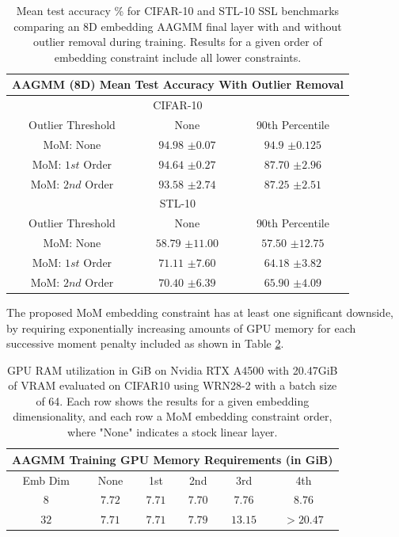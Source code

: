 \documentclass[10pt,twocolumn,letterpaper]{article}
\begin{document}
\begin{table}[ht!]
	\begin{tabular}{c|c|c}
		
		\multicolumn{3}{c}{AAGMM (8D) Mean Test Accuracy With Outlier Removal} \\ \hline\hline
		\multicolumn{3}{c}{CIFAR-10}            \\ 
		\hline
		Outlier Threshold & None & 90th Percentile \\
		\hline
		MoM: None & $94.98$ \scriptsize{$\pm 0.07$} & $94.9$ \scriptsize{$\pm 0.125$} \\
		MoM: $1st$ Order & $94.64$ \scriptsize{$\pm 0.27$} & $87.70$ \scriptsize{$\pm 2.96$}\\
		MoM: $2nd$ Order & $93.58$ \scriptsize{$\pm 2.74$} & $87.25$ \scriptsize{$\pm 2.51$} \\
		
		\hline
		\hline
		\multicolumn{3}{c}{STL-10}            \\ 
		\hline
		Outlier Threshold & None & 90th Percentile \\
		\hline
		MoM: None & $58.79$ \scriptsize{$\pm 11.00$} & $57.50$ \scriptsize{$\pm 12.75$} \\
		MoM: $1st$ Order & $71.11$ \scriptsize{$\pm 7.60$} & $64.18$ \scriptsize{$\pm 3.82$}\\
		MoM: $2nd$ Order & $70.40$ \scriptsize{$\pm 6.39$} & $65.90$ \scriptsize{$\pm 4.09$} \\
	\end{tabular}
	\caption{Mean test accuracy \% for CIFAR-10 and STL-10 SSL benchmarks comparing an 8D embedding AAGMM final layer with and without outlier removal during training. Results for a given order of embedding constraint include all lower constraints.}
	\label{outlierRemoval}
\end{table}

The proposed MoM embedding constraint has at least one significant downside, by requiring exponentially increasing amounts of GPU memory for each successive moment penalty included as shown in Table \ref{gpuRam}.

\begin{table}[h!]
	\begin{tabular}{c|c|c|c|c|c}
		
		\multicolumn{6}{c}{AAGMM Training GPU Memory Requirements (in GiB)} \\
		\hline\hline
		Emb Dim & None & 1st & 2nd & 3rd & 4th \\
		\hline
		$8$ & $7.72$ & $7.71$ & $7.70$ & $7.76$ & $8.76$ \\
		$32$ & $7.71$ & $7.71$ & $7.79$ & $13.15$ & $>20.47$ \\
		
	\end{tabular}
	\caption{GPU RAM utilization in GiB on Nvidia RTX A4500 with 20.47GiB of VRAM evaluated on CIFAR10 using WRN28-2 with a batch size of 64. Each row shows the results for a given embedding dimensionality, and each row a MoM embedding constraint order, where "None" indicates a stock linear layer.}
	\label{gpuRam}
\end{table}
\end{document}
